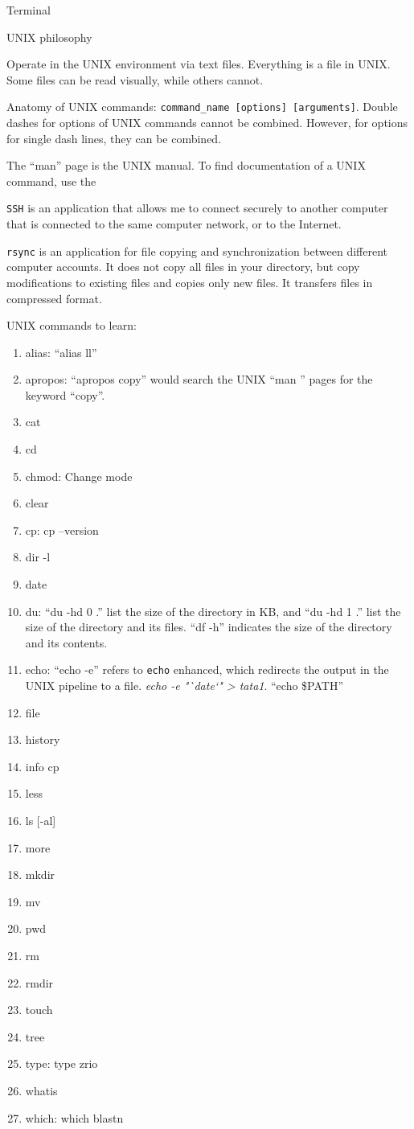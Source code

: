 Terminal 

UNIX philosophy

Operate in the UNIX environment via text files. Everything is a file in UNIX. Some files can be read visually, while others cannot.

Anatomy of UNIX commands: {\tt command\_name [options] [arguments]}. Double dashes for options of UNIX commands cannot be combined. However, for options for single dash lines, they can be combined.

The ``man'' page is the UNIX manual. To find documentation of a UNIX command, use the 

{\tt SSH} is an application that allows me to connect securely to another computer that is connected to the same computer network, or to the Internet.

{\tt rsync} is an application for file copying and synchronization between different computer accounts. It does not copy all files in your directory, but copy modifications to existing files and copies only new files. It transfers files in compressed format.



UNIX commands to learn: \vspace{-0.3cm}
\begin{enumerate}	\itemsep -4pt
	\item alias: ``alias ll''
	\item apropos: ``apropos copy'' would search the UNIX ``man '' pages for the keyword ``copy''.
	\item cat
	\item cd
	\item chmod: Change mode
	\item clear
	\item cp: cp --version
	\item dir -l
	\item date
	\item du: ``du -hd 0 .'' list the size of the directory in KB, and ``du -hd 1 .'' list the size of the directory and its files. ``df -h'' indicates the size of the directory and its contents. 
	\item echo: ``echo -e'' refers to {\tt echo} enhanced, which redirects the output in the UNIX pipeline to a file. {\it echo -e "`date`" > tata1}. ``echo \$PATH''
	\item file
	\item history
	\item info cp
	\item less
	\item ls [-al]
	\item more
	\item mkdir
	\item mv
	\item pwd
	\item rm
	\item rmdir
	\item touch
	\item tree
	\item type: type zrio
	\item whatis
	\item which: which blastn
\end{enumerate}


